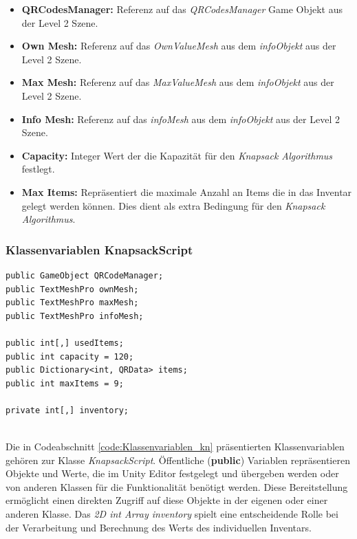 \begin{itemize}
    \item \textbf{QRCodesManager:} Referenz auf das \textit{QRCodesManager} Game Objekt aus der Level 2 Szene.
    \item \textbf{Own Mesh:} Referenz auf das \textit{OwnValueMesh} aus dem \textit{infoObjekt} aus der Level 2 Szene.
    \item \textbf{Max Mesh:} Referenz auf das \textit{MaxValueMesh} aus dem \textit{infoObjekt} aus der Level 2 Szene.
    \item \textbf{Info Mesh:} Referenz auf das \textit{infoMesh} aus dem \textit{infoObjekt} aus der Level 2 Szene.
    \item \textbf{Capacity:} Integer Wert der die Kapazität für den \textit{Knapsack Algorithmus} festlegt.
    \item \textbf{Max Items:} Repräsentiert die maximale Anzahl an Items die in das Inventar gelegt werden können. Dies
    dient als extra Bedingung für den \textit{Knapsack Algorithmus}.\\
\end{itemize}

\subsubsection{Klassenvariablen KnapsackScript}
\begin{lstlisting}[style=csharp, caption={Klassenvariablen des KnapsackSolvers}, label=code:Klassenvariablen_kn]
public GameObject QRCodeManager;
public TextMeshPro ownMesh;
public TextMeshPro maxMesh;
public TextMeshPro infoMesh;

public int[,] usedItems;
public int capacity = 120;
public Dictionary<int, QRData> items;
public int maxItems = 9;

private int[,] inventory;
\end{lstlisting}\\
Die in Codeabschnitt \ref{code:Klassenvariablen_kn} präsentierten Klassenvariablen gehören zur Klasse \textit{KnapsackScript}.
Öffentliche (\textbf{public}) Variablen repräsentieren Objekte und Werte, die im Unity Editor festgelegt und übergeben
werden oder von anderen Klassen für die Funktionalität benötigt werden. Diese Bereitstellung ermöglicht einen direkten
Zugriff auf diese Objekte in der eigenen oder einer anderen Klasse. Das \textit{2D int Array inventory} spielt eine
entscheidende Rolle bei der Verarbeitung und Berechnung des Werts des individuellen Inventars.\\

